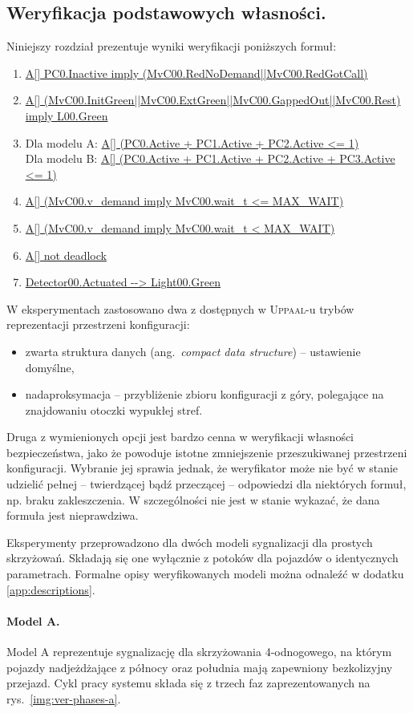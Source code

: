 \documentclass{pracamgr}
\newcommand{\ang}[1]{(ang.~\emph{#1})}
\newcommand{\imgr}[1]{rys.~\ref{#1}}
\newcommand{\upp}{\textsc{Uppaal}}
\newcommand{\ttt}[1]{\url{#1}}
\theoremstyle{plain}
\begin{document}
\subsection{Weryfikacja podstawowych własności.}
Niniejszy rozdział prezentuje wyniki weryfikacji poniższych formuł:
\begin{enumerate}
  \item \ttt{A[] PC0.Inactive imply (MvC00.RedNoDemand||MvC00.RedGotCall)}
  \item \ttt{A[]
  (MvC00.InitGreen||MvC00.ExtGreen||MvC00.GappedOut||MvC00.Rest) imply
  L00.Green}
  \item Dla modelu A: \ttt{A[] (PC0.Active + PC1.Active + PC2.Active
    <= 1)}\\
  Dla modelu B: \ttt{A[] (PC0.Active + PC1.Active + PC2.Active +
    PC3.Active <= 1)}
  \item \ttt{A[] (MvC00.v_demand imply MvC00.wait_t <= MAX_WAIT)}
  \item \ttt{A[] (MvC00.v_demand imply MvC00.wait_t < MAX_WAIT)}
  \item \ttt{A[] not deadlock}
  \item \ttt{Detector00.Actuated --> Light00.Green}
\end{enumerate}

W eksperymentach zastosowano dwa z dostępnych w \upp-u trybów
reprezentacji przestrzeni konfiguracji:
\begin{itemize}
  \item zwarta struktura danych \ang{compact data structure} -- ustawienie domyślne,
  \item nadaproksymacja -- przybliżenie zbioru konfiguracji z góry,
  polegające na znajdowaniu otoczki wypukłej stref.
\end{itemize}
Druga z wymienionych opcji jest bardzo cenna w weryfikacji własności
bezpieczeństwa, jako że powoduje istotne zmniejszenie przeszukiwanej
przestrzeni konfiguracji. Wybranie jej sprawia jednak, że weryfikator
może nie być w stanie udzielić pełnej -- twierdzącej bądź przeczącej
-- odpowiedzi dla niektórych formuł, np. braku zakleszczenia. W
szczególności nie jest w stanie wykazać, że dana formuła jest
nieprawdziwa.


Eksperymenty przeprowadzono dla dwóch modeli sygnalizacji dla prostych
skrzyżowań. Składają się one wyłącznie z potoków dla pojazdów o
identycznych parametrach. Formalne opisy weryfikowanych modeli można
odnaleźć w dodatku \ref{app:descriptions}.

\paragraph{Model A.} Model A reprezentuje sygnalizację dla skrzyżowania
4-odnogowego, na którym pojazdy nadjeżdżające z północy oraz południa
mają zapewniony bezkolizyjny przejazd. Cykl pracy systemu składa się z
trzech faz zaprezentowanych na \imgr{img:ver-phases-a}.
\end{document}
